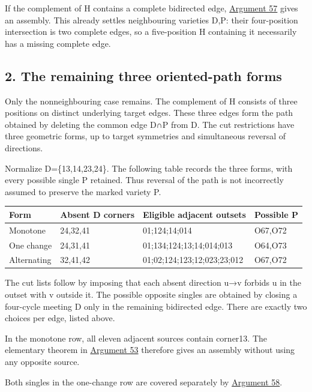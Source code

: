 \documentclass[
  10pt,
]{article}
\begin{document}
If the complement of H contains a complete bidirected edge,
\protect\hyperlink{arg-57}{Argument 57} gives an assembly. This already
settles neighbouring varieties D,P: their four-position intersection is
two complete edges, so a five-position H containing it necessarily has a
missing complete edge.

\hypertarget{the-remaining-three-oriented-path-forms}{%
\subsection*{2. The remaining three oriented-path
forms}\label{the-remaining-three-oriented-path-forms}}

Only the nonneighbouring case remains. The complement of H consists of
three positions on distinct underlying target edges. These three edges
form the path obtained by deleting the common edge D∩P from D. The cut
restrictions have three geometric forms, up to target symmetries and
simultaneous reversal of directions.

Normalize D=\{13,14,23,24\}. The following table records the three
forms, with every possible single P retained. Thus reversal of the path
is not incorrectly assumed to preserve the marked variety P.

\begin{longtable}[]{@{}llll@{}}
\toprule\noalign{}
Form & Absent D corners & Eligible adjacent outsets & Possible P \\
\midrule\noalign{}
\endhead
\bottomrule\noalign{}
\endlastfoot
Monotone & 24,32,41 & 01;124;14;014 & O67,O72 \\
One change & 24,31,41 & 01;134;124;13;14;014;013 & O64,O73 \\
Alternating & 32,41,42 & 01;02;124;123;12;023;23;012 & O67,O72 \\
\end{longtable}

The cut lists follow by imposing that each absent direction u→v forbids
u in the outset with v outside it. The possible opposite singles are
obtained by closing a four-cycle meeting D only in the remaining
bidirected edge. There are exactly two choices per edge, listed above.

In the monotone row, all eleven adjacent sources contain corner13. The
elementary theorem in \protect\hyperlink{arg-53}{Argument 53} therefore
gives an assembly without using any opposite source.

Both singles in the one-change row are covered separately by
\protect\hyperlink{arg-58}{Argument 58}.
\end{document}
